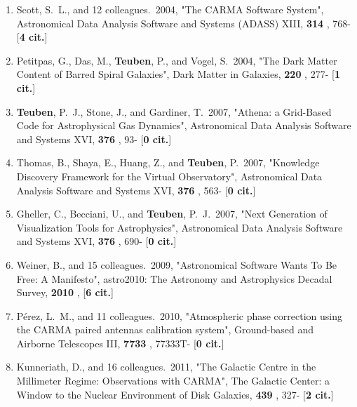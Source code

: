 \documentclass[11pt,letterpaper]{article}
\begin{document}
\begin{enumerate}[resume,label=\textbf{\arabic*}.]
\item  
Scott, S.~L., and 12 colleagues.\  2004,  "The CARMA Software System", 
Astronomical Data Analysis Software and Systems (ADASS) XIII,  {\bf 314} , 
768- [{\bf 4 cit.}] 

\item  
Petitpas, G., Das, M., {\bf Teuben}, P., and Vogel, S.\  2004,  "The Dark Matter 
Content of Barred Spiral Galaxies", Dark Matter in Galaxies,  {\bf 220} , 
277- [{\bf 1 cit.}] 


\item  
{\bf Teuben}, P.~J., Stone, J., and Gardiner, T.\  2007,  "Athena: a Grid-Based 
Code for Astrophysical Gas Dynamics", Astronomical Data Analysis Software 
and Systems XVI,  {\bf 376} , 93- [{\bf 0 cit.}] 

\item  
Thomas, B., Shaya, E., Huang, Z., and {\bf Teuben}, P.\  2007,  "Knowledge 
Discovery Framework for the Virtual Observatory", Astronomical Data 
Analysis Software and Systems XVI,  {\bf 376} , 563- [{\bf 0 cit.}] 

\item  
Gheller, C., Becciani, U., and {\bf Teuben}, P.~J.\  2007,  "Next Generation of 
Visualization Tools for Astrophysics", Astronomical Data Analysis Software 
and Systems XVI,  {\bf 376} , 690- [{\bf 0 cit.}] 

\item  
Weiner, B., and 15 colleagues.\  2009,  "Astronomical Software Wants To Be 
Free: A Manifesto", astro2010: The Astronomy and Astrophysics Decadal 
Survey,  {\bf 2010} ,  [{\bf 6 cit.}] 


\item  
P{\'e}rez, L.~M., and 11 colleagues.\  2010,  "Atmospheric phase correction 
using the CARMA paired antennas calibration system", Ground-based and 
Airborne Telescopes III,  {\bf 7733} , 77333T- [{\bf 0 cit.}] 





\item  
Kunneriath, D., and 16 colleagues.\  2011,  "The Galactic Centre in the 
Millimeter Regime: Observations with CARMA", The Galactic Center: a Window 
to the Nuclear Environment of Disk Galaxies,  {\bf 439} , 327- [{\bf 2 
cit.}] 



\end{enumerate}
\end{document}

